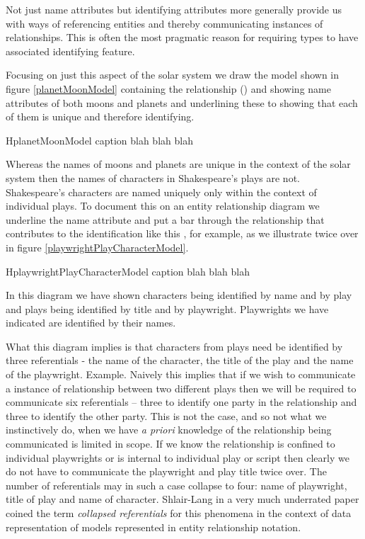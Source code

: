 \begin{newtt}
\mynote
 Not just name attributes but identifying attributes more generally provide us with ways of 
 referencing entities and thereby communicating instances of relationships. 
 This is often the most pragmatic reason for requiring types to have associated identifying feature. 

 \mynote
Focusing on just this aspect of the solar system we  draw the model shown in figure
\ref{planetMoonModel}
containing the relationship () and showing name attributes of both moons and planets and
underlining these to showing that each of them is unique and therefore identifying. 

\begin{erboxedFigure} {H}{planetMoonModel}
{
caption blah blah blah
 }

\end{erboxedFigure}

\mynote
Whereas the names of moons and planets are unique in the context of the solar system then the names of characters in Shakespeare's plays are not. Shakespeare's characters are named uniquely only within the context of individual plays. To document this on an entity relationship diagram we underline the name attribute and put a bar through the relationship that contributes to the identification like this \barkerEllisJ, for example, as we illustrate twice over in figure \ref{playwrightPlayCharacterModel}.


\begin{erboxedFigure} {H}{playwrightPlayCharacterModel}
{
caption blah blah blah
 }

\end{erboxedFigure}

In this diagram we have shown characters being identified by name and by play 
and plays being identified by title and by playwright. Playwrights we have indicated are identified by their names.

\mynote What this diagram implies is that characters from plays need be identified by three referentials - the name of the character, the title of the play and the name of the playwright.
Example.
\mynote Naively this implies that if we wish to communicate a instance of relationship between two different plays then we will be required to communicate six referentials
 -- three to identify one party in the relationship and three to identify the other party. This is not the case, and so not what we instinctively do, when we have \textit{a priori} knowledge of the relationship being communicated is limited in scope. If we know the relationship is confined to individual playwrights or is internal to individual play or script then clearly we do not have to communicate the playwright and play title twice over. The number of referentials may in such a case collapse to four: name of playwright, title of play and name of character.
Shlair-Lang in a very much underrated paper coined the term \textit{collapsed referentials} for this phenomena in the context of data representation of models represented in entity relationship notation.


\end{newtt}
